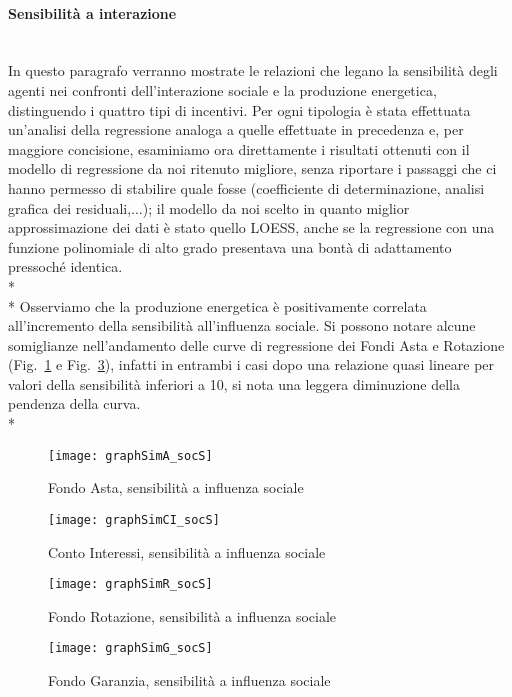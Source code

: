 \documentclass[12pt,a4paper,openright,twoside]{report}
\newcommand{\myparagraph}[1]{\paragraph{#1}\mbox{}\\}
\begin{document}
\myparagraph{Sensibilità a interazione}

In questo paragrafo verranno mostrate le relazioni che legano la sensibilità degli agenti nei confronti dell'interazione sociale e la produzione energetica, distinguendo i quattro tipi di incentivi. Per ogni tipologia è stata effettuata un'analisi della regressione analoga a quelle effettuate in precedenza e, per maggiore concisione, esaminiamo ora direttamente i risultati ottenuti con il modello di regressione da noi ritenuto migliore, senza riportare i passaggi che ci hanno permesso di stabilire quale fosse (coefficiente di determinazione, analisi grafica dei residuali,...); il modello da noi scelto in quanto miglior approssimazione dei dati è stato quello LOESS, anche se la regressione con una funzione polinomiale di alto grado presentava una bontà di adattamento pressoché identica.\\* \\*
Osserviamo che  la produzione energetica è positivamente correlata all'incremento della sensibilità all'influenza sociale. Si possono notare alcune somiglianze nell'andamento delle curve di regressione dei Fondi Asta e Rotazione (Fig.~\ref{graphAsocS} e Fig.~\ref{graphRsocS}), infatti in entrambi i casi dopo una relazione quasi lineare per valori della sensibilità inferiori a 10, si nota una leggera diminuzione della pendenza della curva. \\*

\begin{figure}[H]
	\centering
	\texttt{[image: graphSimA\_socS]}
	\caption{Fondo Asta, sensibilità a influenza sociale}
	\label{graphAsocS}
\end{figure}

\begin{figure}[hbt]
	\centering
	\texttt{[image: graphSimCI\_socS]}
	\caption{Conto Interessi, sensibilità a influenza sociale}
	\label{graphCIsocS}
\end{figure}

\begin{figure}[H]
	\centering
	\texttt{[image: graphSimR\_socS]}
	\caption{Fondo Rotazione, sensibilità a influenza sociale}
	\label{graphRsocS}
\end{figure}

\begin{figure}[hbt]
	\centering
	\texttt{[image: graphSimG\_socS]}
	\caption{Fondo Garanzia, sensibilità a influenza sociale}
	\label{graphGsocS}
\end{figure}
\end{document}
